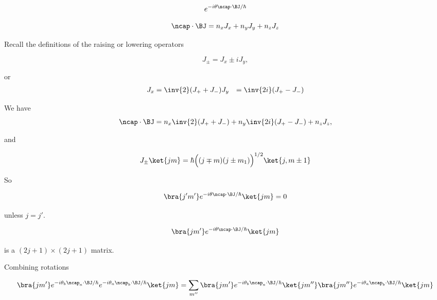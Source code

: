 \begin{equation}\label{eqn:qmTwoL17:n}
e^{-i \theta \ncap \cdot \BJ/\hbar}
\end{equation}

\begin{equation}\label{eqn:qmTwoL17:n}
\ncap \cdot \BJ = n_x J_x + n_y J_y + n_z J_z
\end{equation}

Recall the definitions of the raising or lowering operators

\begin{equation}\label{eqn:qmTwoL17:n}
J_\pm = J_x \pm i J_y,
\end{equation}

or
\begin{align}\label{eqn:qmTwoL17:n}
J_x &= \inv{2} (J_{+} + J_{-})
J_y &= \inv{2i} (J_{+} - J_{-})
\end{align}

We have
\begin{equation}\label{eqn:qmTwoL17:n}
\ncap \cdot \BJ = 
n_x 
\inv{2} (J_{+} + J_{-})
+ 
n_y 
\inv{2i} (J_{+} - J_{-})
+ 
n_z J_z,
\end{equation}

and 

\begin{equation}\label{eqn:qmTwoL17:n}
J_\pm \ket{j m} = \hbar \Bigl(
(j \mp m)(j \pm m_1)
\Bigr)^{1/2}
\ket{j, m \pm 1}
\end{equation}

So

\begin{equation}\label{eqn:qmTwoL17:n}
\bra{j' m'} e^{-i \theta \ncap \cdot \BJ/\hbar} \ket{j m} = 0
\end{equation}

unless $j = j'$.

\begin{equation}\label{eqn:qmTwoL17:n}
\bra{j m'} e^{-i \theta \ncap \cdot \BJ/\hbar} \ket{j m}
\end{equation}

is a $(2j + 1) \times (2 j+ 1)$ matrix.

Combining rotations

\begin{equation}\label{eqn:qmTwoL17:n}
\bra{j m'} 
e^{-i \theta_b \ncap_a \cdot \BJ/\hbar}
e^{-i \theta_a \ncap_b \cdot \BJ/\hbar}
 \ket{j m}
=
\sum_{m''}
\bra{j m'} 
e^{-i \theta_b \ncap_a \cdot \BJ/\hbar}
\ket{j m''} \bra{j m''}
e^{-i \theta_a \ncap_b \cdot \BJ/\hbar}
 \ket{j m}
\end{equation}

